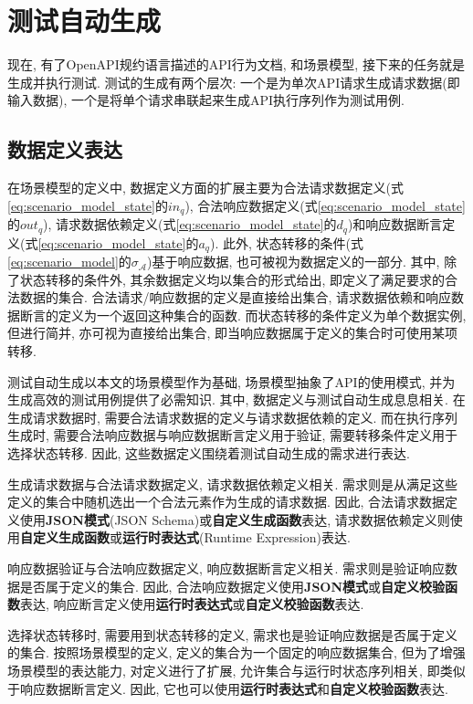 \chapter{测试自动生成}

    现在, 有了OpenAPI规约语言描述的API行为文档, 和场景模型, 接下来的任务就是生成并执行测试. 测试的生成有两个层次: 一个是为单次API请求生成请求数据(即输入数据), 一个是将单个请求串联起来生成API执行序列作为测试用例.
    
    \section{数据定义表达}
    
        在场景模型的定义中, 数据定义方面的扩展主要为合法请求数据定义(式\ref{eq:scenario_model_state}的$in_q$), 合法响应数据定义(式\ref{eq:scenario_model_state}的$out_q$), 请求数据依赖定义(式\ref{eq:scenario_model_state}的$d_q$)和响应数据断言定义(式\ref{eq:scenario_model_state}的$a_q$). 此外, 状态转移的条件(式\ref{eq:scenario_model}的$\sigma_{\mathcal{A}}$)基于响应数据, 也可被视为数据定义的一部分. 其中, 除了状态转移的条件外, 其余数据定义均以集合的形式给出, 即定义了满足要求的合法数据的集合. 合法请求/响应数据的定义是直接给出集合, 请求数据依赖和响应数据断言的定义为一个返回这种集合的函数. 而状态转移的条件定义为单个数据实例, 但进行简并, 亦可视为直接给出集合, 即当响应数据属于定义的集合时可使用某项转移.
        
        测试自动生成以本文的场景模型作为基础, 场景模型抽象了API的使用模式, 并为生成高效的测试用例提供了必需知识. 其中, 数据定义与测试自动生成息息相关. 在生成请求数据时, 需要合法请求数据的定义与请求数据依赖的定义. 而在执行序列生成时, 需要合法响应数据与响应数据断言定义用于验证, 需要转移条件定义用于选择状态转移. 因此, 这些数据定义围绕着测试自动生成的需求进行表达.
        
        生成请求数据与合法请求数据定义, 请求数据依赖定义相关. 需求则是从满足这些定义的集合中随机选出一个合法元素作为生成的请求数据. 因此, 合法请求数据定义使用\textbf{JSON模式}(JSON Schema)或\textbf{自定义生成函数}表达, 请求数据依赖定义则使用\textbf{自定义生成函数}或\textbf{运行时表达式}(Runtime Expression)表达.
        
        响应数据验证与合法响应数据定义, 响应数据断言定义相关. 需求则是验证响应数据是否属于定义的集合. 因此, 合法响应数据定义使用\textbf{JSON模式}或\textbf{自定义校验函数}表达, 响应断言定义使用\textbf{运行时表达式}或\textbf{自定义校验函数}表达.
        
        选择状态转移时, 需要用到状态转移的定义, 需求也是验证响应数据是否属于定义的集合. 按照场景模型的定义, 定义的集合为一个固定的响应数据集合, 但为了增强场景模型的表达能力, 对定义进行了扩展, 允许集合与运行时状态序列相关, 即类似于响应数据断言定义. 因此, 它也可以使用\textbf{运行时表达式}和\textbf{自定义校验函数}表达.
        

